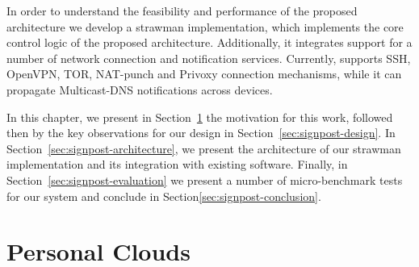 
In order to understand the feasibility and performance of the proposed
architecture we develop a strawman implementation, which implements the core
control logic of the proposed architecture.  Additionally, it integrates support
for a number of network connection and notification services.  Currently,
\signpost supports SSH, OpenVPN, TOR, NAT-punch and Privoxy connection
mechanisms, while it can propagate Multicast-DNS notifications across devices.

In this chapter, we present in Section~\ref{sec:signpost-introduction} the
motivation for this work, followed then by the key observations for our design
in Section~\ref{sec:signpost-design}. In
Section~\ref{sec:signpost-architecture}, we present the architecture of our
strawman implementation and its integration with existing software. Finally, in
Section~\ref{sec:signpost-evaluation} we present a number of micro-benchmark
tests for our system and conclude in Section\ref{sec:signpost-conclusion}.

\section{Personal Clouds}\label{sec:signpost-introduction}


